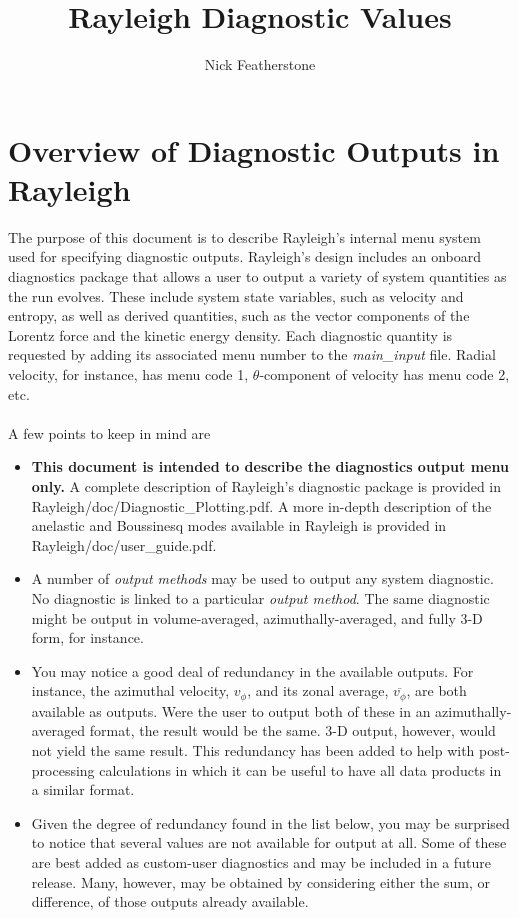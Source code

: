\documentclass[10pt, letterpaper]{article}
\begin{document}
\title{Rayleigh Diagnostic Values}
\author{Nick Featherstone}

\maketitle

\tableofcontents

\clearpage

\section{Overview of Diagnostic Outputs in Rayleigh}
The purpose of this document is to describe Rayleigh's internal menu system used for specifying diagnostic outputs.  Rayleigh's design includes an onboard diagnostics package that allows a user to output a variety of system quantities as the run evolves.  These include system state variables, such as velocity and entropy, as well as derived quantities, such as the vector components of the Lorentz force and the kinetic energy density.  Each diagnostic quantity is requested by adding its associated menu number to the \textit{main\_input} file.  Radial velocity, for instance, has menu code 1, $\theta$-component of velocity has menu code 2, etc.    
\\
\\
A few points to keep in mind are
\begin{itemize}
\item \textbf{This document is intended to describe the diagnostics output menu only.}   A complete description of Rayleigh's diagnostic package is provided in Rayleigh/doc/Diagnostic\_Plotting.pdf.   A more in-depth description of the anelastic and Boussinesq modes available in Rayleigh is provided in Rayleigh/doc/user\_guide.pdf.
\item A number of \textit{output methods} may be used to output any system diagnostic.  No diagnostic is linked to a particular \textit{output method}.  The same diagnostic might be output in volume-averaged, azimuthally-averaged, and fully 3-D form, for instance.
\item You may notice a good deal of redundancy in the available outputs.  For instance, the azimuthal velocity, $v_\phi$, and its zonal average, $\overline{v_\phi}$, are both available as outputs.  Were the user to output both of these in an azimuthally-averaged format, the result would be the same.  3-D output, however, would not yield the same result.  This redundancy has been added to help with post-processing calculations in which it can be useful to have all data products in a similar format.
\item Given the degree of redundancy found in the list below, you may be surprised to notice that several values are not available for output at all.  Some of these are best added as custom-user diagnostics and may be included in a future release.  Many, however, may be obtained by considering either the sum, or difference, of those outputs already available.

\end{itemize}  
 
\end{document}
